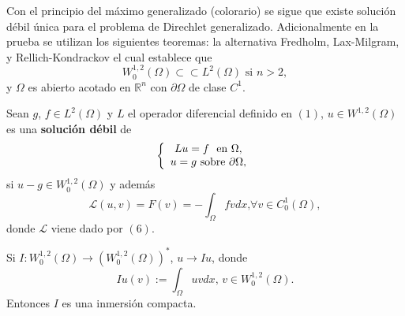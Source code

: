 

Con el principio del m\'{a}ximo generalizado (colorario) se sigue
que existe soluci\'{o}n d\'{e}bil \'{u}nica para el problema de
Direchlet generalizado. Adicionalmente en la prueba se utilizan
los siguientes teoremas: la alternativa Fredholm, Lax-Milgram, y
Rellich-Kondrackov el cual establece que
\[
W_{0}^{1,2}\left(  \Omega\right)  \subset\subset L^{2}\left(  \Omega\right)
\text{ \ si }n>2,
\]
y $\Omega$ es abierto acotado en $\mathbb{R}^{n}$ con $\partial\Omega$ de
clase $C^{1}$.
\begin{definition}
Sean $g$, $f\in L^{2}\left(  \Omega\right)  $ y $L$ el operador diferencial
definido en $\left(  1\right)  $, $u\in W^{1,2}\left(  \Omega\right)  $ es una
\textbf{soluci\'{o}n d\'{e}bil} de
\[
\left\{
\begin{array}
[c]{c}%
Lu=f\text{ \ en }\Omega,\\
u=g\text{ sobre }\partial\Omega,
\end{array}
\right.
\]
si $u-g\in W_{0}^{1,2}\left(  \Omega\right)  $ y adem\'{a}s
\begin{equation}
\mathcal{L}\left(  u,v\right)  =F\left(  v\right)  =-\int_{\Omega}fvdx\text{,
}\forall v\in C_{0}^{1}\left(  \Omega\right)  ,\tag{8}%
\end{equation}
donde $\mathcal{L}$ viene dado por $\left(  6\right)  .$
\end{definition}
\begin{lemma}
Si $I:W_{0}^{1,2}\left(  \Omega\right)  \longrightarrow\left(  W_{0}%
^{1,2}\left(  \Omega\right)  \right)  ^{\ast}$, $u\longrightarrow Iu$, donde
\[
Iu\left(  v\right)  :=\int_{\Omega}uvdx\text{, }v\in W_{0}^{1,2}\left(
\Omega\right)  .
\]
Entonces $I$ es una inmersi\'{o}n compacta.
\end{lemma}
